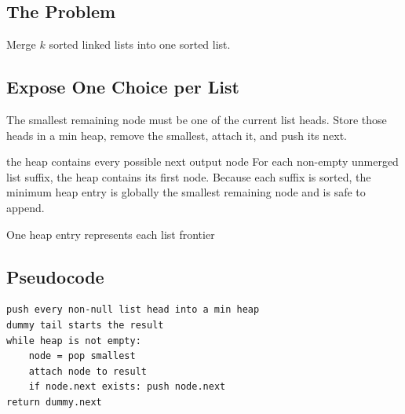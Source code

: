 \subsection{The Problem}
Merge \(k\) sorted linked lists into one sorted list.

\subsection{Expose One Choice per List}
The smallest remaining node must be one of the current list heads. Store those
heads in a min heap, remove the smallest, attach it, and push its next.

\begin{invariantbox}{the heap contains every possible next output node}
For each non-empty unmerged list suffix, the heap contains its first node.
Because each suffix is sorted, the minimum heap entry is globally the smallest
remaining node and is safe to append.
\end{invariantbox}

\begin{visualbox}{One heap entry represents each list frontier}
\centering
{}
\end{visualbox}

\subsection{Pseudocode}
\begin{lstlisting}[style=pseudocode]
push every non-null list head into a min heap
dummy tail starts the result
while heap is not empty:
    node = pop smallest
    attach node to result
    if node.next exists: push node.next
return dummy.next
\end{lstlisting}

